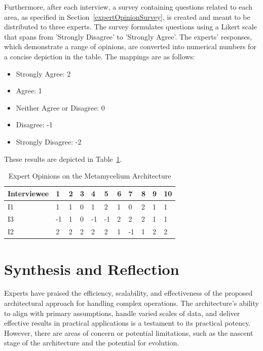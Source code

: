 \documentclass[journal]{IEEEtran}
\begin{document}
Furthermore, after each interview, a survey containing questions related to each area, as specified in Section~\ref{expertOpinionSurvey}, is created and meant to be distributed to three experts. The survey formulates questions using a Likert scale that spans from 'Strongly Disagree' to 'Strongly Agree'. The experts' responses, which demonstrate a range of opinions, are converted into numerical numbers for a concise depiction in the table. The mappings are as follows:

\begin{itemize}
  \item Strongly Agree: 2
  \item Agree: 1
  \item Neither Agree or Disagree: 0
  \item Disagree: -1
  \item Strongly Disagree: -2
\end{itemize}

These results are depicted in Table~\ref{tab:expertOpinionSurveyResults}.

\begin{table}[h]
  \centering
  \caption{Expert Opinions on the Metamycelium Architecture}
  \begin{tabularx}{\textwidth}{l|X|X|X|X|X|X|X|X|X|X}
  \toprule
  \textbf{Interviewee} & \textbf{1} & \textbf{2} & \textbf{3} & \textbf{4} & \textbf{5} & \textbf{6} & \textbf{7} & \textbf{8} & \textbf{9} & \textbf{10} \\
  \midrule
  I1 & 1 & 1 & 0 & 1 & 2 & 1 & 0 & 2 & 1 & 1 \\
  I3 & -1 & 1 & 0 & -1 & -1 & 2 & 2 & 2 & 1 & 1 \\
  I2 & 2 & 2 & 2 & 2 & 2 & 1 & -1 & 1 & 2 & 2 \\
  \bottomrule
  \end{tabularx}
  \label{tab:expertOpinionSurveyResults}
\end{table}


\section{Synthesis and Reflection} \label{expertOpinion_synthesisReflection}


Experts have praised the efficiency, scalability, and effectiveness of the proposed architectural approach for handling complex operations. The architecture's ability to align with primary assumptions, handle varied scales of data, and deliver effective results in practical applications is a testament to its practical potency. However, there are areas of concern or potential limitations, such as the nascent stage of the architecture and the potential for evolution.
\end{document}
